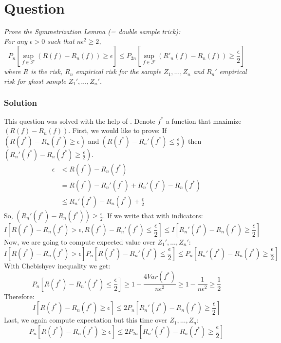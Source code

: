 \documentclass{article}
\newcounter{counterquestion}
\newenvironment{question}[1]
{
\stepcounter{counterquestion}
\section*{Question \thecounterquestion}
\emph{#1} 
} 
{
}
\newenvironment{solution}
{
\subsubsection*{Solution}
} 
{
}
\begin{document}
\begin{question}{Prove the Symmetrization Lemma (= double sample trick): \\
For any $\epsilon > 0$ such that $n\epsilon^2 \geq 2$, 
\[
P_n \left[ \sup_{f \in \mathcal{F}} (R(f) - R_n(f)) \geq \epsilon \right] \leq P_{2n} \left[ \sup_{f \in \mathcal{F}} (R'_n(f) - R_n(f)) \geq \frac{\epsilon}{2} \right]
\]
where $R$ is the risk, $R_n$ empirical risk for the sample $Z_1, \dots, Z_n$ and $R_n'$ empirical risk for ghost sample $Z_1', \dots, Z_n'$.}
\begin{solution}
This question was solved with the help of \cite{question3}.
Denote $f^*$ a function that maximize $(R(f) - R_n(f))$. First, we would like to prove: If $(R(f^*) - R_n(f^*) \geq \epsilon)$ and $(R(f^*) - R_n'(f^*) \leq \frac{\epsilon}{2})$ then $(R_n'(f^*) - R_n(f^*) \geq \frac{\epsilon}{2})$.
\begin{align*}
\epsilon & < R(f^*) - R_n(f^*) \\
& = R(f^*) - R_n'(f^*) + R_n'(f^*) - R_n(f^*) \\
& \leq R_n'(f^*) - R_n(f^*) + \frac{\epsilon}{2}
\end{align*}
So, $(R_n'(f^*) - R_n(f^*)) \geq \frac{\epsilon}{2}$. If we write that with indicators:
\[
I \left[ R(f^*) - R_n(f^*) > \epsilon, R(f^*) - R_n'(f^*) \leq \frac{\epsilon}{2} \right] \leq I \left[ R_n'(f^*) - R_n(f^*) \geq \frac{\epsilon}{2} \right]
\]
Now, we are going to compute expected value over $Z_1', \dots, Z_n'$:
\[
I \left[ R(f^*) - R_n(f^*) > \epsilon \right] P_n \left[ R(f^*) - R_n'(f^*) \leq \frac{\epsilon}{2} \right] \leq P_n \left[ R_n'(f^*) - R_n(f^*) \geq \frac{\epsilon}{2} \right]
\]
With Chebishyev inequality we get:
\[
P_n \left[ R(f^*) - R_n'(f^*) \leq \frac{\epsilon}{2} \right] \geq 1- \frac{4 Var(f^*)}{n\epsilon^2} \geq 1 - \frac{1}{n\epsilon^2} \geq \frac{1}{2}
\]
Therefore:
\[
I \left[ R(f^*) - R_n(f^*) \geq \epsilon \right]  \leq 2 P_n \left[ R_n'(f^*) - R_n(f^*) \geq \frac{\epsilon}{2} \right]
\]
Last, we again compute expectation but this time over $Z_1, \dots, Z_n$:
\[
P_n \left[ R(f^*) - R_n(f^*) \geq \epsilon \right]  \leq 2 P_{2n} \left[ R_n'(f^*) - R_n(f^*) \geq \frac{\epsilon}{2} \right]
\]
\end{solution}
\end{question}




\end{document}
